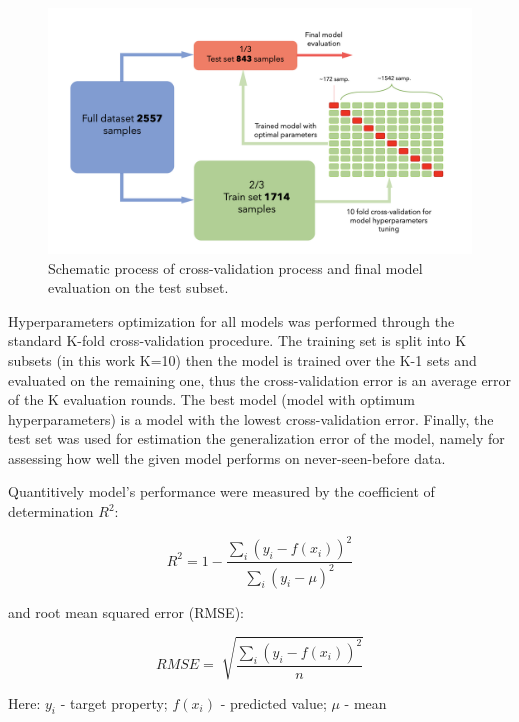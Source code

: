 \begin{figure}[H]
\centering
\captionsetup{justification=centering,margin=2cm}
	\includegraphics[width=160mm]{fig/ml_fig/model_eval.png}
	\caption[Schematic process of cross-validation process and final model evaluation on the test subset]{Schematic process of cross-validation process and final model evaluation on the test subset.}
\label{fig:ml_model_eval}
\end{figure}

Hyperparameters optimization for all models was performed through the standard K-fold cross-validation procedure. The training set is split into K subsets (in this work K=10) then the model is trained over the K-1 sets and evaluated on the remaining one, thus the cross-validation error is an average error of the K evaluation rounds. The best model (model with optimum hyperparameters) is a model with the lowest cross-validation error.
Finally, the test set was used for estimation the generalization error of the model, namely for assessing how well the given model performs on never-seen-before data.

Quantitively model’s performance were measured by the coefficient of determination $R^2$:

\begin{equation}
R^2 = 1 - \frac{\sum \limits_{i}( y_i - f(x_i))^2}{\sum \limits_{i} (y_i - \mu)^2}
\end{equation}

and root mean squared error (RMSE):

\begin{equation}
RMSE = \sqrt[]{\frac{\sum \limits_{i}( y_i - f(x_i))^2}{n}}
\end{equation}

Here: $y_i$ - target property; $f(x_i)$ - predicted value; $\mu$ - mean

